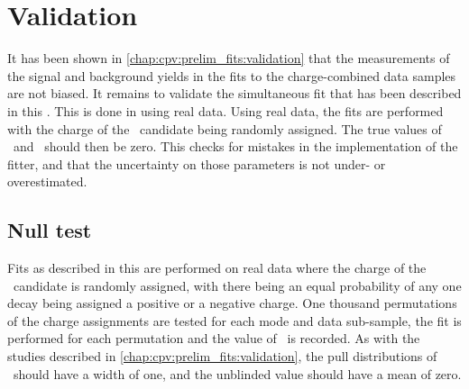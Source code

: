 \begin{table}
  \centering
  \caption{%
    Model parameters as determined in the preliminary fit to the 2012 magnet 
    down subset of the \pKK\ data.
  }
  \label{tab:cpv:araw:params:pKK}
  
\end{table}

\begin{table}
  \centering
  \caption{%
    Model parameters as determined in the preliminary fit to the 2012 magnet 
    down subset of the \ppipi\ data.
  }
  \label{tab:cpv:araw:params:ppipi}
  
\end{table}

\section{Validation}
\label{chap:cpv:araw:validation}

It has been shown in \cref{chap:cpv:prelim_fits:validation} that the 
measurements of the signal and background yields in the fits to the 
charge-combined data samples are not biased.
It remains to validate the simultaneous fit that has been described in this 
.
This is done in using real data.
Using real data, the fits are performed with the charge of the \PLambdac\ 
candidate being randomly assigned.
The true values of \ARaw\ and \ARawBg\ should then be zero.
This checks for mistakes in the implementation of the fitter, and that the 
uncertainty on those parameters is not under- or overestimated.

\subsection{Null test}
\label{chap:cpv:araw:validation:null}

Fits as described in this  are performed on real data 
where the charge of the \PLambdac\ candidate is randomly assigned, with there 
being an equal probability of any one decay being assigned a positive or a 
negative charge.
One thousand permutations of the charge assignments are tested for each mode 
and data sub-sample, the fit is performed for each permutation and the value of 
\ARaw\ is recorded.
As with the studies described in \cref{chap:cpv:prelim_fits:validation}, the 
pull distributions of \ARaw\ should have a width of one, and the unblinded 
value should have a mean of zero.

